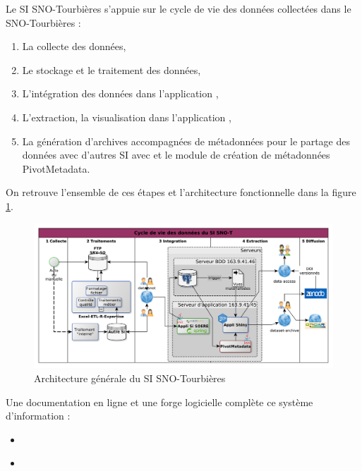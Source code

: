 \documentclass[]{article}
\newcommand{\mhref}[3][blue]{\href{#2}{\color{#1}{#3}}}%
\newcommand{\SNOT}{{SNO-Tourbières}}
\newcommand{\datasnot}{{\mhref{https://data-snot.cnrs.fr/}{data-snot}}}
\newcommand{\dataaccess}{{\mhref{https://data-snot.cnrs.fr/data-access/}{data-access}}}
\newcommand{\dataarchive}{{\mhref{https://data-snot.cnrs.fr/dataset-archive/}{dataset-archive}}}
\begin{document}
Le SI \SNOT{} s'appuie sur le cycle de vie des données collectées dans le \SNOT{} : 

\begin{enumerate}
	\item La collecte des données,
	\item Le stockage et le traitement des données,
	\item L'intégration des données dans l'application \datasnot,
	\item L'extraction, la visualisation dans l'application \dataaccess,
	\item La génération d'archives accompagnées de métadonnées pour le partage des données avec d'autres SI avec \dataarchive et le module de création de métadonnées \og{}PivotMetadata\fg{}.
\end{enumerate}
	
On retrouve l'ensemble de ces étapes et l'architecture fonctionnelle dans la figure \ref{Diagramme_archifonctionnelle}.

\begin{figure}[htbp]
	\begin{center}
		\includegraphics[width=14cm]{Diagramme_archifonctionnelle_complet.pdf}
		\caption{Architecture générale du SI \SNOT}
		\label{Diagramme_archifonctionnelle}		
	\end{center}
\end{figure}

Une documentation en ligne et une forge logicielle complète ce système d'information : 

\begin{itemize}
	\item \mhref{https://sourcesup.renater.fr/www/si-snot/5_Architecture_SI-SNOT.html}{Documentation en ligne}
	\item \mhref{https://forge-osuc.cnrs-orleans.fr/projects/sie-sno-tourbiere/}{Forge logicielle}\\
\end{itemize}
\end{document}
